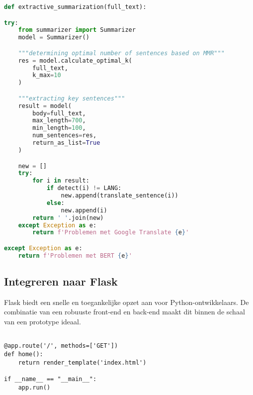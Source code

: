 \begin{lstlisting}[language=Python]
def extractive_summarization(full_text):

try:    
    from summarizer import Summarizer
    model = Summarizer()

    """determining optimal number of sentences based on MMR"""
    res = model.calculate_optimal_k(
        full_text, 
        k_max=10
    )

    """extracting key sentences"""
    result = model(
        body=full_text,
        max_length=700,
        min_length=100,
        num_sentences=res,
        return_as_list=True
    )

    new = []
    try:
        for i in result:
            if detect(i) != LANG:
                new.append(translate_sentence(i))
            else:
                new.append(i)
        return ' '.join(new)
    except Exception as e:
        return f'Problemen met Google Translate {e}'

except Exception as e:
    return f'Problemen met BERT {e}'
\end{lstlisting}

\subsection{Integreren naar Flask}

Flask biedt een snelle en toegankelijke opzet aan voor Python-ontwikkelaars. De combinatie van een robuuste front-end en back-end maakt dit binnen de schaal van een prototype ideaal.

\begin{lstlisting}

@app.route('/', methods=['GET'])
def home():
	return render_template('index.html')

if __name__ == "__main__":
	app.run()
\end{lstlisting}


